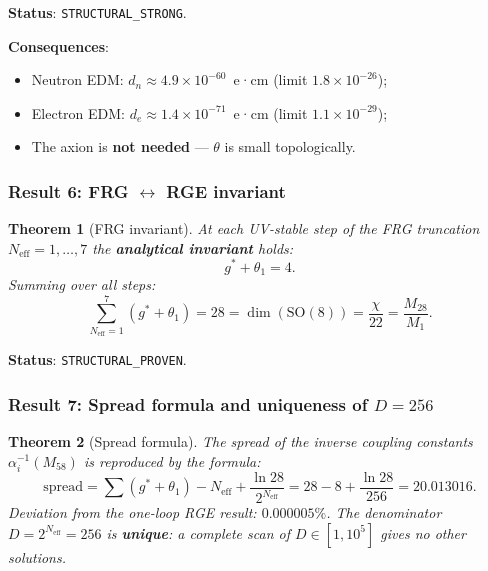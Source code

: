 \documentclass[11pt,a4paper]{article}
\newcommand{\SO}{\ensuremath{\mathrm{SO}}}
\newtheorem{theorem}{Theorem}[section]
\theoremstyle{definition}
\begin{document}
\medskip\noindent
\textbf{Status}: \texttt{STRUCTURAL\_STRONG}.

\medskip\noindent
\textbf{Consequences}:
\begin{itemize}
    \item Neutron EDM: $d_n \approx 4.9 \times 10^{-60}$~e·cm
          (limit $1.8 \times 10^{-26}$);
    \item Electron EDM: $d_e \approx 1.4 \times 10^{-71}$~e·cm
          (limit $1.1 \times 10^{-29}$);
    \item The axion is \textbf{not needed} --- $\theta$ is small topologically.
\end{itemize}

\subsubsection{Result 6: FRG \texorpdfstring{$\leftrightarrow$}{} RGE invariant}

\begin{theorem}[FRG invariant]
\label{thm:conclusion-frg}
At each UV-stable step of the FRG truncation $N_{\text{eff}} = 1, \ldots, 7$
the \textbf{analytical invariant} holds:
\begin{equation}
    \boxed{
    g^* + \theta_1 = 4.
    }
    \label{eq:conclusion-invariant}
\end{equation}
Summing over all steps:
\begin{equation}
    \boxed{
    \sum_{N_{\text{eff}} = 1}^{7} (g^* + \theta_1) = 28
    = \dim(\SO(8)) = \frac{\chi}{22} = \frac{M_{28}}{M_1}.
    }
    \label{eq:conclusion-sum-28}
\end{equation}
\end{theorem}

\medskip\noindent
\textbf{Status}: \texttt{STRUCTURAL\_PROVEN}.

\subsubsection{Result 7: Spread formula and uniqueness of \texorpdfstring{$D = 256$}{D = 256}}

\begin{theorem}[Spread formula]
\label{thm:conclusion-spread}
The spread of the inverse coupling constants $\alpha_i^{-1}(M_{58})$
is reproduced by the formula:
\begin{equation}
    \boxed{
    \text{spread} = \sum(g^* + \theta_1) - N_{\text{eff}}
    + \frac{\ln 28}{2^{N_{\text{eff}}}}
    = 28 - 8 + \frac{\ln 28}{256}
    = 20.013016.
    }
    \label{eq:conclusion-spread}
\end{equation}
Deviation from the one-loop RGE result:
$\mathbf{0.000005\%}$.
The denominator $D = 2^{N_{\text{eff}}} = 256$ is \textbf{unique}:
a complete scan of $D \in [1, 10^5]$ gives no other solutions.
\end{theorem}
\end{document}
